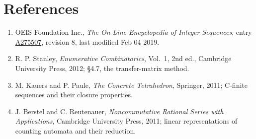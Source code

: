 \documentclass[11pt]{article}
\theoremstyle{definition}
\begin{document}
\section{References}

\begin{enumerate}

\item OEIS Foundation Inc., \emph{The On-Line Encyclopedia of Integer Sequences}, entry \href{https://oeis.org/A275507}{A275507}, revision 8, last modified Feb 04 2019.

\item R. P. Stanley, \emph{Enumerative Combinatorics}, Vol.~1, 2nd ed., Cambridge University Press, 2012; \S4.7, the transfer-matrix method.

\item M. Kauers and P. Paule, \emph{The Concrete Tetrahedron}, Springer, 2011; C-finite sequences and their closure properties.

\item J. Berstel and C. Reutenauer, \emph{Noncommutative Rational Series with Applications}, Cambridge University Press, 2011; linear representations of counting automata and their reduction.

\end{enumerate}
\end{document}
